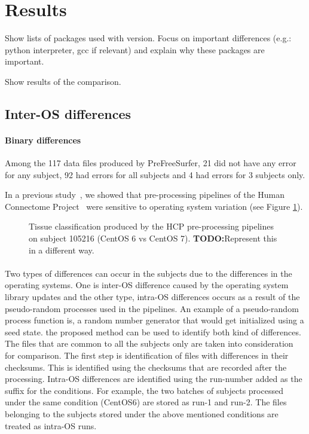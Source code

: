 \documentclass{article}
\newcommand{\todo}[1]{\color{red}\textbf{TODO:}#1\color{black}}
\begin{document}
\section{Results}

Show lists of packages used with version. Focus on important
differences (e.g.: python interpreter, gcc if relevant) and explain
why these packages are important.

Show results of the comparison.

\subsection{Inter-OS differences}


\paragraph{Binary differences}


Among the 117 data files produced by PreFreeSurfer, 21 did not have any error for any subject, 92 had errors 
for all subjects and 4 had errors for 3 subjects only. 

In a previous study~\cite{Scaria2017}, we showed that
pre-processing pipelines of the Human Connectome
Project~\cite{Glasser2013} were sensitive to operating system
variation (see Figure \ref{fig:1}).
\begin{figure}
  \caption{Tissue classification produced by the HCP pre-processing
    pipelines on subject 105216 (CentOS 6 vs CentOS 7). \todo{Represent this in a different way.}}
  \label{fig:1}
\end{figure}

\paragraph{}
Two types of differences can occur in the subjects due to the differences in the operating systems. 
One is inter-OS difference caused by the operating system library updates and the other type,
 intra-OS differences occurs as a result of the pseudo-random processes used in the pipelines.
 An example of a pseudo-random process function is, a random number generator that would get initialized 
using a seed state. the proposed method can be used to identify both kind of differences. 
The files that are common to all the subjects only are taken into consideration for comparison. The first step
 is identification of files with differences in their checksums. This is identified using the checksums that are
 recorded after the processing. Intra-OS differences are identified using the run-number added as the suffix for
 the conditions. For example, the two batches of subjects processed under the same condition (CentOS6) are stored 
as run-1 and run-2. The files belonging to the subjects stored under the above mentioned conditions are treated as intra-OS runs.
\end{document}
